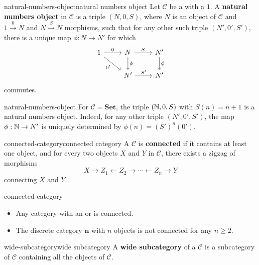 \begin{topic}{natural-numbers-object}{natural numbers object}
    Let $\mathcal{C}$ be a  with a  $1$. A \textbf{natural numbers object} in $\mathcal{C}$ is a triple $(N, 0, S)$, where $N$ is an object of $\mathcal{C}$ and $1 \xrightarrow{0} N$ and $N \xrightarrow{S} N$ morphisms, such that for any other such triple $(N', 0', S')$, there is a unique map $\phi : N \to N'$ for which
    \[ \begin{tikzcd} 1 \arrow{r}{0} \arrow[swap]{rd}{0'} & N \arrow{d}{\phi} \arrow{r}{S} & N' \arrow{d}{\phi} \\ & N' \arrow{r}{S'} & N' \end{tikzcd} \]
    commutes.
\end{topic}

\begin{example}{natural-numbers-object}
    For $\mathcal{C} = \textbf{Set}$, the triple $(\mathbb{N}, 0, S)$ with $S(n) = n + 1$ is a natural numbers object. Indeed, for any other triple $(N', 0', S')$, the map $\phi : \mathbb{N} \to N'$ is uniquely determined by $\phi(n) = (S')^n(0')$.
\end{example}

\begin{topic}{connected-category}{connected category}
    A  $\mathcal{C}$ is \textbf{connected} if it contains at least one object, and for every two objects $X$ and $Y$ in $\mathcal{C}$, there exists a zigzag of morphisms
    \[ X \rightarrow Z_1 \leftarrow Z_2 \rightarrow \cdots \leftarrow Z_n \rightarrow Y \]
    connecting $X$ and $Y$.
\end{topic}

\begin{example}{connected-category}
    \begin{itemize}
        \item Any category with an  or  is connected.
        \item The discrete category $\textbf{n}$ with $n$ objects is not connected for any $n \ge 2$.
    \end{itemize}
\end{example}

\begin{topic}{wide-subcategory}{wide subcategory}
    A \textbf{wide subcategory} of a  $\mathcal{C}$ is a subcategory of $\mathcal{C}$ containing all the objects of $\mathcal{C}$.
\end{topic}


